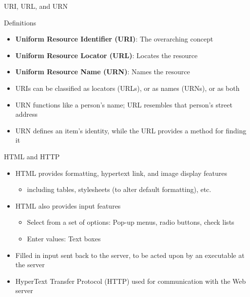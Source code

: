\documentclass[aspectratio=169, xcolor=dvipsnames]{beamer}
\begin{document}
\begin{frame}{URI, URL, and URN}
    \begin{block}{Definitions}
        \begin{itemize}[<+->]
            \item \textbf{Uniform Resource Identifier (URI)}: The overarching concept
            \item \textbf{Uniform Resource Locator (URL)}: Locates the resource
            \item \textbf{Uniform Resource Name (URN)}: Names the resource
        \end{itemize}
    \end{block}
    \begin{itemize}[<+->]
        \item URIs can be classified as locators (URLs), or as names (URNs), or as both
        \item URN functions like a person's name; URL resembles that person's street address
        \item URN defines an item's identity, while the URL provides a method for finding it
    \end{itemize}
\end{frame}

\begin{frame}{HTML and HTTP}
    \begin{itemize}[<+->]
        \item HTML provides formatting, hypertext link, and image display features
        \begin{itemize}
            \item[$\triangleright$] including tables, stylesheets (to alter default formatting), etc.
        \end{itemize}
        \item HTML also provides input features
        \begin{itemize}
            \item[$\triangleright$] Select from a set of options: Pop-up menus, radio buttons, check lists
            \item[$\triangleright$] Enter values: Text boxes
        \end{itemize}
        \item Filled in input sent back to the server, to be acted upon by an executable at the server
        \item HyperText Transfer Protocol (HTTP) used for communication with the Web server
    \end{itemize}
\end{frame}
\end{document}
